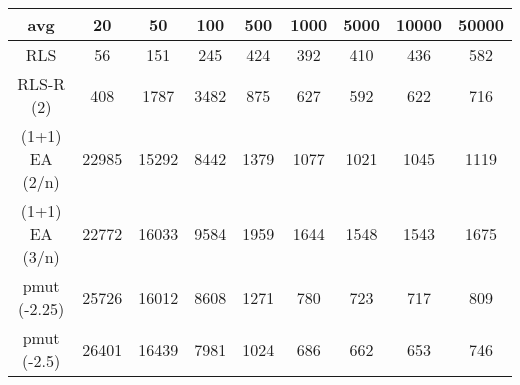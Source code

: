 \begin{tabular}[h]{ccccccccc}
avg&20&50&100&500&1000&5000&10000&50000\\\hline
RLS&56&151&245&424&392&410&436&582\\
RLS-R (2)&408&1787&3482&875&627&592&622&716\\
(1+1) EA (2/n)&22985&15292&8442&1379&1077&1021&1045&1119\\
(1+1) EA (3/n)&22772&16033&9584&1959&1644&1548&1543&1675\\
pmut (-2.25)&25726&16012&8608&1271&780&723&717&809\\
pmut (-2.5)&26401&16439&7981&1024&686&662&653&746\\
\end{tabular}

